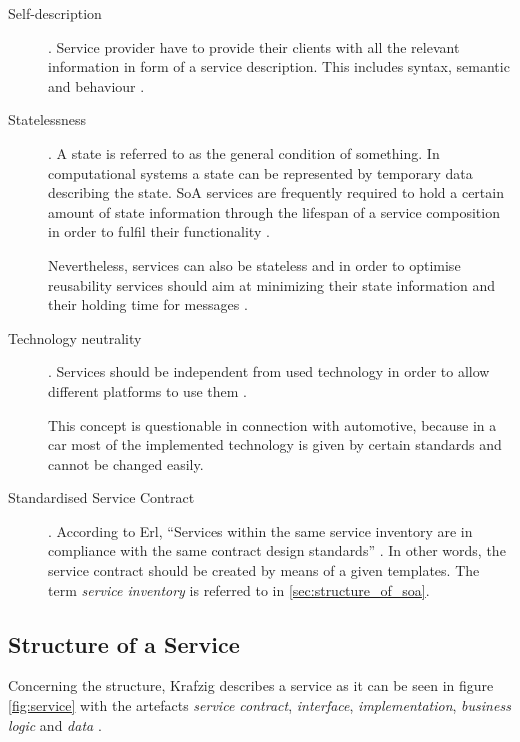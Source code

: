 \begin{description}
\item [Self-description].
Service provider have to provide their clients with all the relevant information in form of a service description. This includes syntax, semantic and behaviour \cite{breivold}.

\item [Statelessness].
A state is referred to as the general condition of something. In computational systems a state can be represented by temporary data describing the state. SoA services are frequently required to hold a certain amount of state information through the lifespan of a service composition in order to fulfil their functionality \cite[ch.11]{erl2008}. 

Nevertheless, services can also be stateless and in order to optimise reusability services should aim at minimizing their state information and their holding time for messages \cite{breivold} \cite[p.27]{erl2011}.

\item [Technology neutrality].
Services should be independent from used technology in order to allow different platforms to use them \cite{breivold}. 

This concept is questionable in connection with automotive, because in a car most of the implemented technology is given by certain standards and cannot be changed easily.

\item [Standardised Service Contract].
According to Erl, ``Services within the same service inventory are in compliance with the same contract design standards'' \cite[p.27]{erl2011}. In other words, the service contract should be created by means of a given templates. The term \emph{service inventory} is referred to in \ref{sec:structure_of_soa}.
\end{description}



\subsection{Structure of a Service}
\label{sec:service_structure}
Concerning the structure, Krafzig describes a service as it can be seen in figure \ref{fig:service} with the artefacts \emph{service contract}, \emph{interface}, \emph{implementation}, \emph{business logic} and \emph{data} \cite[p.44]{krafzig}.

